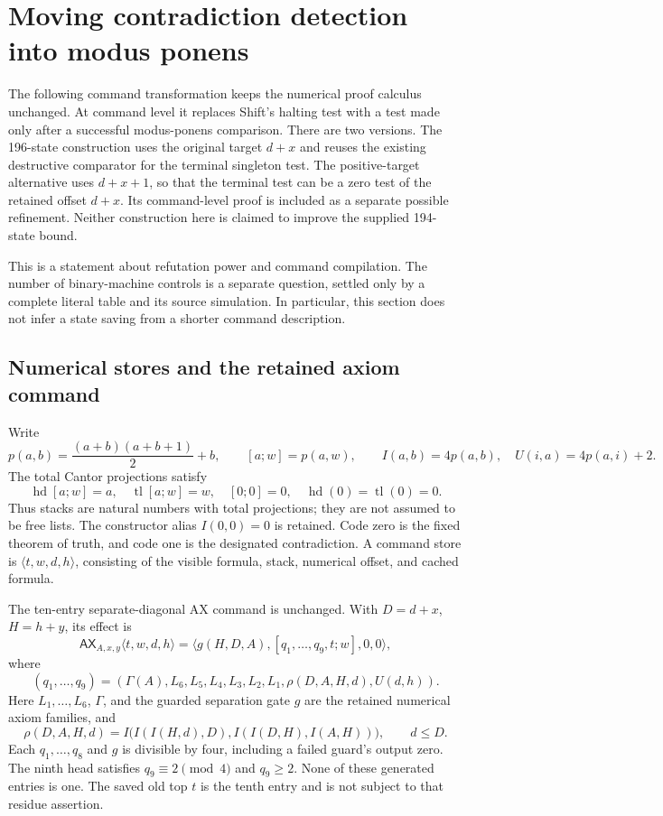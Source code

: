 \section{Moving contradiction detection into modus ponens}
\label{sec:mp-halt}

The following command transformation keeps the numerical proof calculus
unchanged. At command level it replaces Shift's halting test with a test
made only after a successful modus-ponens comparison. There are two versions.
The 196-state construction uses the original target $d+x$ and reuses the
existing destructive comparator for the terminal singleton test. The
positive-target alternative uses $d+x+1$, so that the terminal test can
be a zero test of the retained offset $d+x$. Its command-level proof is
included as a separate possible refinement. Neither construction here
is claimed to improve the supplied 194-state bound.

This is a statement about refutation power and command compilation. The
number of binary-machine controls is a separate question, settled only by
a complete literal table and its source simulation. In particular, this
section does not infer a state saving from a shorter command description.

\subsection{Numerical stores and the retained axiom command}

Write
\[
 p(a,b)=\frac{(a+b)(a+b+1)}2+b,
 \qquad [a;w]=p(a,w),\qquad
 I(a,b)=4p(a,b),\quad U(i,a)=4p(a,i)+2.
\]
The total Cantor projections satisfy
\[
 \operatorname{hd}[a;w]=a,
 \quad\operatorname{tl}[a;w]=w,
 \quad[0;0]=0,
 \quad\operatorname{hd}(0)=\operatorname{tl}(0)=0.
\]
Thus stacks are natural numbers with total projections; they are not
assumed to be free lists. The constructor alias $I(0,0)=0$ is retained.
Code zero is the fixed theorem of truth, and code one is the designated
contradiction. A command store is $\langle t,w,d,h\rangle$, consisting of
the visible formula, stack, numerical offset, and cached formula.

The ten-entry separate-diagonal AX command is unchanged. With
$D=d+x$, $H=h+y$, its effect is
\[
 \mathsf{AX}_{A,x,y}\langle t,w,d,h\rangle
 =\langle g(H,D,A),[q_1,\ldots,q_9,t;w],0,0\rangle,
 \tag{MH1}
\]
where
\[
 (q_1,\ldots,q_9)=
 (\Gamma(A),L_6,L_5,L_4,L_3,L_2,L_1,
       \rho(D,A,H,d),U(d,h)).
\]
Here $L_1,\ldots,L_6$, $\Gamma$, and the guarded separation gate $g$
are the retained numerical axiom families, and
\[
 \rho(D,A,H,d)=
 I\bigl(I(I(H,d),D),I(I(D,H),I(A,H))\bigr),\qquad d\le D.
\]
Each $q_1,\ldots,q_8$ and $g$ is divisible by four, including a failed
guard's output zero. The ninth head satisfies $q_9\equiv2\pmod4$ and
$q_9\ge2$. None of these generated entries is one. The saved old top
$t$ is the tenth entry and is not subject to that residue assertion.

